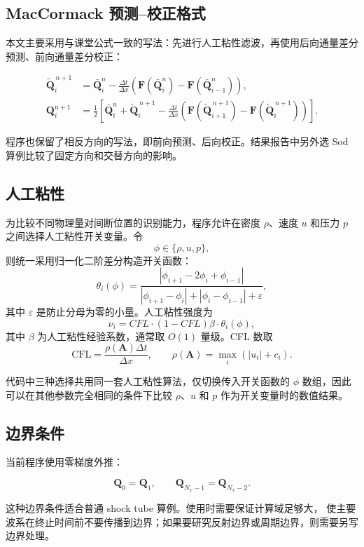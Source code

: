 \subsection{MacCormack 预测--校正格式}

本文主要采用与课堂公式一致的写法：先进行人工粘性滤波，再使用后向通量差分预测、前向通量差分校正：

\begin{align}
\widetilde{\bm{Q}}_i^{\,n+1}
&=
\bar{\bm{Q}}_i^n
-
\frac{\Delta t}{\Delta x}
\left(
\bm{F}(\bar{\bm{Q}}_i^n)-\bm{F}(\bar{\bm{Q}}_{i-1}^n)
\right),\\
\bm{Q}_i^{n+1}
&=
\frac{1}{2}
\left[
\bar{\bm{Q}}_i^n+\widetilde{\bm{Q}}_i^{\,n+1}
-
\frac{\Delta t}{\Delta x}
\left(
\bm{F}(\widetilde{\bm{Q}}_{i+1}^{\,n+1})
-
\bm{F}(\widetilde{\bm{Q}}_i^{\,n+1})
\right)
\right].
\end{align}

程序也保留了相反方向的写法，即前向预测、后向校正。结果报告中另外选 Sod 算例比较了固定方向和交替方向的影响。

\subsection{人工粘性}

为比较不同物理量对间断位置的识别能力，程序允许在密度 $\rho$、速度 $u$
和压力 $p$ 之间选择人工粘性开关变量。令
\begin{equation}
\phi\in\{\rho,u,p\},
\end{equation}
则统一采用归一化二阶差分构造开关函数：
\begin{equation}
\theta_i(\phi)=
\frac{
\left|\phi_{i+1}-2\phi_i+\phi_{i-1}\right|
}{
\left|\phi_{i+1}-\phi_{i}\right|
+\left|\phi_{i}-\phi_{i-1}\right|
+\varepsilon
},
\end{equation}
其中 $\varepsilon$ 是防止分母为零的小量。人工粘性强度为
\begin{equation}
\nu_i=CFL\cdot(1-CFL)\beta\cdot\theta_i(\phi),
\end{equation}
其中 $\beta$ 为人工粘性经验系数，通常取 \(O(1)\) 量级。CFL 数取
\[
\mathrm{CFL}=\frac{\rho(\mathbf A)\Delta t}{\Delta x},
\qquad
\rho(\mathbf A)=\max_i(|u_i|+c_i).
\]

代码中三种选择共用同一套人工粘性算法，仅切换传入开关函数的
$\phi$ 数组，因此可以在其他参数完全相同的条件下比较
$\rho$、$u$ 和 $p$ 作为开关变量时的数值结果。

\subsection{边界条件}

当前程序使用零梯度外推：

\begin{equation}
\bm{Q}_0=\bm{Q}_1,
\qquad
\bm{Q}_{N_x-1}=\bm{Q}_{N_x-2}.
\end{equation}

这种边界条件适合普通 shock tube 算例。使用时需要保证计算域足够大，
使主要波系在终止时间前不要传播到边界；如果要研究反射边界或周期边界，则需要另写边界处理。
